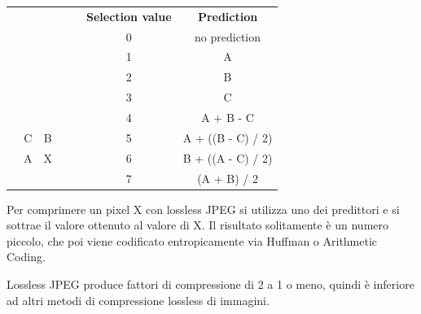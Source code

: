 \begin{table}[htbp!]
\centering
\begin{tabular}{|c|c|c|c|c|cc} 
\cline{6-7}
\multicolumn{1}{l}{} & \multicolumn{1}{l}{} & \multicolumn{1}{l}{} & \multicolumn{1}{l}{} & \multicolumn{1}{l}{} & \textbf{Selection value} & \textbf{Prediction}  \\ 
\cline{6-7}
\multicolumn{1}{c}{} & \multicolumn{1}{c}{} & \multicolumn{1}{c}{} & \multicolumn{1}{c}{} & \multicolumn{1}{c}{} & 0                        & no prediction        \\
\multicolumn{1}{c}{} & \multicolumn{1}{c}{} & \multicolumn{1}{c}{} & \multicolumn{1}{c}{} & \multicolumn{1}{c}{} & 1                        & A                    \\
\multicolumn{1}{c}{} & \multicolumn{1}{c}{} & \multicolumn{1}{c}{} & \multicolumn{1}{c}{} & \multicolumn{1}{c}{} & 2                        & B                    \\
\multicolumn{1}{c}{} & \multicolumn{1}{c}{} & \multicolumn{1}{c}{} & \multicolumn{1}{c}{} & \multicolumn{1}{c}{} & 3                        & C                    \\ 
\cline{1-5}
                     &                      &                      &                      &                      & 4                        & A + B - C            \\ 
\cline{1-5}
                     & C                    & B                    &                      &                      & 5                        & A + ((B - C) / 2)    \\ 
\cline{1-5}
                     & A                    & X                    &                      &                      & 6                        & B + ((A - C) / 2)    \\ 
\cline{1-5}
                     &                      &                      &                      &                      & 7                        & (A + B) / 2          \\
\cline{1-5}
\end{tabular}
\end{table}
\FloatBarrier

Per comprimere un pixel X con lossless JPEG si utilizza uno dei predittori e si sottrae il valore ottenuto al valore di X. Il risultato solitamente è un numero piccolo, che poi viene codificato entropicamente via Huffman o Arithmetic Coding.

Lossless JPEG produce fattori di compressione di 2 a 1 o meno, quindi è inferiore ad altri metodi di compressione lossless di immagini.


